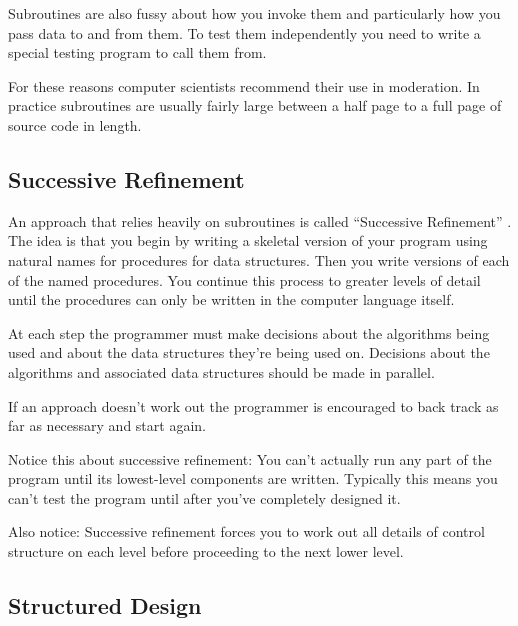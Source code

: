 Subroutines are also fussy about how you invoke them and particularly
how you pass data to and from them. To test them independently you
need to write a special testing program to call them from.

For these reasons computer scientists recommend their use in
moderation.  In practice subroutines are usually fairly large between
a half page to a full page of source code in length.


\subsection{Successive Refinement}
An approach that relies heavily on subroutines is called ``Successive
Refinement'' \cite{wirth71}. The idea is that you begin by writing a
skeletal version of your program using natural names for procedures
for data structures. Then you write versions of each of the named
procedures.  You continue this process to greater levels of detail
until the procedures can only be written in the computer language
itself.

At each step the programmer must make decisions about the algorithms
being used and about the data structures they're being used on.
Decisions about the algorithms
and associated data structures should be made in parallel.

If an approach doesn't work out the programmer is encouraged to back
track as far as necessary and start again.

Notice this about successive refinement: You can't actually run any
part of the program until its lowest-level components are written.
Typically this means you can't test the program until after you've
completely designed it. 

Also notice: Successive refinement forces you to work out
all details of control structure on each level before proceeding
to the next lower level.


\subsection{Structured Design}

